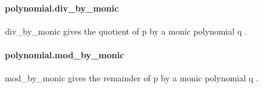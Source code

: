 \documentclass{article}
\begin{document}
\paragraph{polynomial.div\_by\_monic}
\par
\colorbox[RGB]{253,246,227}{{{{\color[RGB]{101, 123, 131} div\_by\_monic }}}} gives the quotient of 
\colorbox[RGB]{253,246,227}{{{{\color[RGB]{101, 123, 131} p }}}} by a monic polynomial 
\colorbox[RGB]{253,246,227}{{{{\color[RGB]{101, 123, 131} q }}}}.
\paragraph{polynomial.mod\_by\_monic}
\par
\colorbox[RGB]{253,246,227}{{{{\color[RGB]{101, 123, 131} mod\_by\_monic }}}} gives the remainder of 
\colorbox[RGB]{253,246,227}{{{{\color[RGB]{101, 123, 131} p }}}} by a monic polynomial 
\colorbox[RGB]{253,246,227}{{{{\color[RGB]{101, 123, 131} q }}}}.
\end{document}

